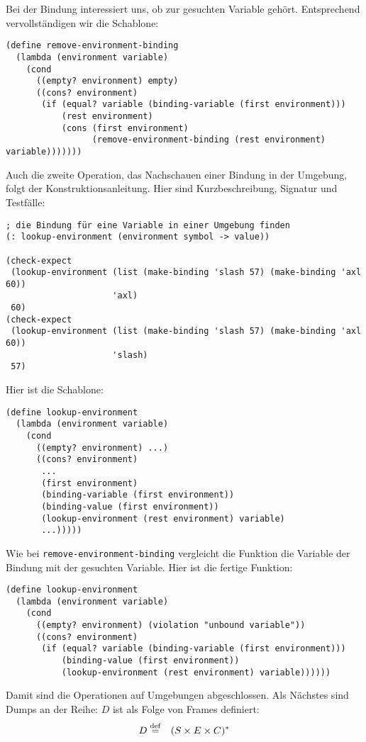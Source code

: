 %
Bei der Bindung interessiert uns, ob zur gesuchten Variable gehört.
Entsprechend vervollständigen wir die Schablone:
%
\begin{lstlisting}
(define remove-environment-binding
  (lambda (environment variable)
    (cond
      ((empty? environment) empty)
      ((cons? environment)
       (if (equal? variable (binding-variable (first environment)))
           (rest environment)
           (cons (first environment)
                 (remove-environment-binding (rest environment) variable)))))))
\end{lstlisting} 
%
Auch die zweite Operation, das Nachschauen einer Bindung in der
Umgebung, folgt der Konstruktionsanleitung.  Hier sind
Kurzbeschreibung, Signatur und Testfälle:
%
\begin{lstlisting}
; die Bindung für eine Variable in einer Umgebung finden
(: lookup-environment (environment symbol -> value))

(check-expect
 (lookup-environment (list (make-binding 'slash 57) (make-binding 'axl 60)) 
                     'axl)
 60)
(check-expect
 (lookup-environment (list (make-binding 'slash 57) (make-binding 'axl 60))
                     'slash)
 57)
\end{lstlisting}
%
Hier ist die Schablone:
%
\begin{lstlisting}
(define lookup-environment
  (lambda (environment variable)
    (cond
      ((empty? environment) ...)
      ((cons? environment)
       ...
       (first environment)
       (binding-variable (first environment))
       (binding-value (first environment))
       (lookup-environment (rest environment) variable)
       ...)))))
\end{lstlisting}
%
Wie bei \lstinline{remove-environment-binding} vergleicht die Funktion
die Variable der Bindung mit der gesuchten Variable.  Hier ist die
fertige Funktion:
%
\begin{lstlisting}
(define lookup-environment
  (lambda (environment variable)
    (cond
      ((empty? environment) (violation "unbound variable"))
      ((cons? environment)
       (if (equal? variable (binding-variable (first environment)))
           (binding-value (first environment))
           (lookup-environment (rest environment) variable))))))
\end{lstlisting}
%
%
Damit sind die Operationen auf Umgebungen abgeschlossen.  Als Nächstes
sind Dumps an der Reihe: $D$ ist als Folge von Frames definiert:
%
\begin{eqnarray*}
  D &\stackrel{\rm def}{=}& (S\times E \times C)^\ast
\end{eqnarray*}
